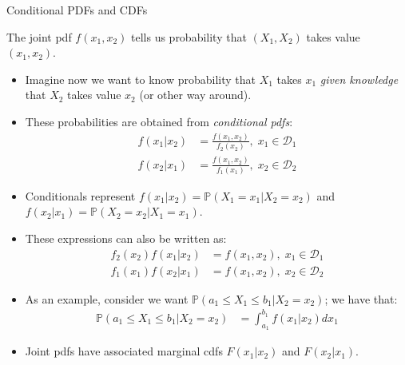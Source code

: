 \documentclass[9pt]{beamer}
\begin{document}
%
\begin{frame}{Conditional PDFs and CDFs}

The joint pdf $f(x_1,x_2)$ tells us  probability that $(X_1,X_2)$ takes value $(x_1,x_2)$.

\begin{itemize}
\item Imagine now we want to know probability that $X_1$ takes $x_1$ {\em given knowledge} that $X_2$ takes value $x_2$ (or other way around). 

\item These probabilities are obtained from {\em conditional pdfs}:
\begin{align*}
f(x_1|x_2)&=\frac{f(x_1,x_2)}{f_2(x_2)},\; x_1\in \mathcal{D}_1\\
f(x_2|x_1)&=\frac{f(x_1,x_2)}{f_1(x_1)},\; x_2\in \mathcal{D}_2
\end{align*}
\item Conditionals represent $f(x_1|x_2)=\mathbb{P}(X_1=x_1|X_2=x_2)$ and $f(x_2|x_1)=\mathbb{P}(X_2=x_2|X_1=x_1)$.
\item These expressions can also be written as:
 \begin{align*}
{f_2(x_2)}f(x_1|x_2)&={f(x_1,x_2)},\; x_1\in \mathcal{D}_1\\
{f_1(x_1)}f(x_2|x_1)&={f(x_1,x_2)},\; x_2\in \mathcal{D}_2
\end{align*}
\item As an example, consider we want $\mathbb{P}(a_1\leq X_1\leq b_1|X_2=x_2)$; we have that:
\begin{align*}
\mathbb{P}(a_1\leq X_1\leq b_1|X_2=x_2)&=\int_{a_1}^{b_1}f(x_1|x_2)dx_1
\end{align*}

\item Joint pdfs have associated marginal cdfs $F(x_1|x_2)$ and $F(x_2|x_1)$. 

\end{itemize}

\end{frame}
\end{document}
